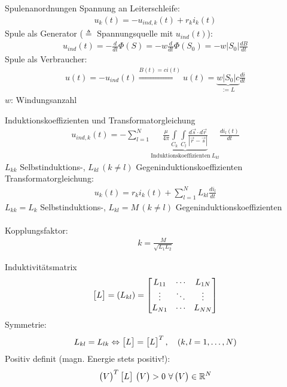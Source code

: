 \documentclass[a6paper]{kartei}
\begin{document}
\begin{karte}{Spulenanordnungen}
Spannung an Leiterschleife:
\begin{align}
u_{k}(t) = -u_{ind,k}(t) + r_{k}i_{k}(t)
\end{align}
Spule als Generator ($\triangleq$ Spannungsquelle mit $u_{ind}(t)$):
\begin{align}
u_{ind}(t) = - \frac{d}{dt} \Phi(S) = - w \frac{d}{dt} \Phi(S_{0}) = -w |S_{0}| \frac{dB}{dt}
\end{align}
Spule als Verbraucher:
\begin{align}
u(t) = -u_{ind}(t) \stackrel{B(t) = c i(t)}{\Longrightarrow} u(t) = \underbrace{w|S_{0}|c}_{:= L} \frac{di}{dt}
\end{align}
$w$: Windungsanzahl
\end{karte}

\begin{karte}{Induktionskoeffizienten und Transformatorgleichung}
\begin{align}
u_{ind,k}(t) = - \sum \limits_{l=1}^{N} \underbrace{\frac{\mu}{4\pi} \int \limits_{C_{k}} \int \limits_{C_{l}} \frac{d\vec{s} \cdot d\vec{r}}{|\vec{r}-\vec{s}|}}_{\text{Induktionskoeffizienten} \ L_{kl}}  \frac{di_{l}(t)}{dt}
\end{align}
$L_{kk}$ Selbstinduktions-, $L_{kl} \, (k \neq l)$ Gegeninduktionskoeffizienten \\
Transformatorgleichung:
\begin{align}
u_{k}(t) = r_{k}i_{k}(t) + \sum \limits_{l=1}^{N} L_{kl} \frac{di_{l}}{dt}
\end{align}
$L_{kk} = L_{k} $ Selbstinduktions-, $L_{kl} = M \, (k \neq l)$ Gegeninduktionskoeffizienten \\
\\
Kopplungsfaktor:
\begin{align}
k = \frac{M}{\sqrt{L_{1}L_{2}}} 
\end{align}
\end{karte}

\begin{karte}{Induktivitätsmatrix}
\begin{eqnarray*}
\begin{bmatrix} L \end{bmatrix} = (L_{kl}) = \begin{bmatrix} L_{11} & \cdots & L_{1N} \\ \vdots & \ddots & \vdots \\ L_{N1} & \cdots & L_{NN} \end{bmatrix}
\end{eqnarray*}
Symmetrie: 
\begin{eqnarray*}
L_{kl} = L_{lk} \Leftrightarrow \begin{bmatrix} L \end{bmatrix} = \begin{bmatrix} L \end{bmatrix}^{T}, \quad (k,l = 1, \dots, N)
\end{eqnarray*}
Positiv definit (magn. Energie stets positiv!): 
\begin{eqnarray*}
 \begin{pmatrix} V \end{pmatrix}^{T} \begin{bmatrix} L \end{bmatrix}  \, \begin{pmatrix} V \end{pmatrix} > 0 \ \forall \begin{pmatrix} V \end{pmatrix} \in \mathbb{R}^{N}
\end{eqnarray*}
\end{karte}
\end{document}
